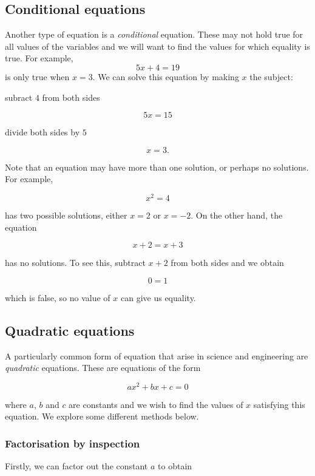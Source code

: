 \documentclass[
]{book}
\theoremstyle{definition}
\theoremstyle{definition}
\theoremstyle{definition}
\theoremstyle{definition}
\theoremstyle{remark}
\begin{document}
\hypertarget{conditional-equations}{%
\subsection{Conditional equations}\label{conditional-equations}}

Another type of equation is a \emph{conditional} equation. These may not hold true for all values of the variables and we will want to find the values for which equality is true. For example,
\[5x+4=19\]
is only true when \(x=3\). We can solve this equation by making \(x\) the subject:

subract \(4\) from both sides

\[5x=15\]

divide both sides by \(5\)

\[x=3.\]

Note that an equation may have more than one solution, or perhaps no solutions. For example,

\[x^2=4\]

has two possible solutions, either \(x=2\) or \(x=-2\). On the other hand, the equation

\[x+2=x+3\]

has no solutions. To see this, subtract \(x+2\) from both sides and we obtain

\[0=1\]

which is false, so no value of \(x\) can give us equality.

\hypertarget{quadratic-equations}{%
\subsection{Quadratic equations}\label{quadratic-equations}}

A particularly common form of equation that arise in science and engineering are \emph{quadratic} equations. These are equations of the form

\[ax^2+bx+c=0\]

where \(a\), \(b\) and \(c\) are constants and we wish to find the values of \(x\) satisfying this equation. We explore some different methods below.

\hypertarget{factorisation-by-inspection}{%
\subsubsection{Factorisation by inspection}\label{factorisation-by-inspection}}

Firstly, we can factor out the constant \(a\) to obtain
\end{document}
